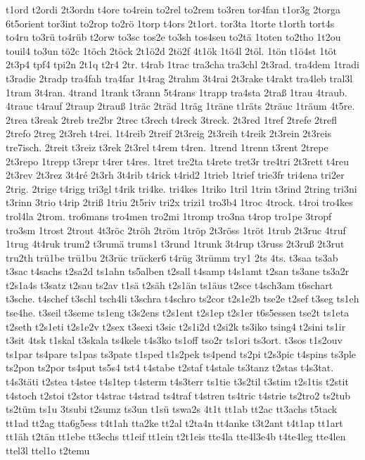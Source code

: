 {t1ord
t2ordi
2t3ordn
t4ore
to4rein
to2rel
to2rem
to3ren
tor4fan
t1or3g
2torga
6t5orient
tor3int
to2rop
to2rö
1torp
t4ors
2t1ort.
tor3ta
1torte
t1orth
tort4s
to4ru
to3rü
to4rüb
t2orw
to3sc
tos2e
to3sh
tos4seu
to2tä
1toten
to2tho
1t2ou
touil4
to3un
tö2c
1töch
2töck
2t1ö2d
2tö2f
4t1ök
1tö4l
2töl.
1tön
t1ö4st
1töt
2t3p4
tpf4
tpi2n
2t1q
t2r4
2tr.
t4rab
1trac
tra3cha
tra3chl
2t3rad.
tra4dem
1tradi
t3radie
2tradp
tra4fah
tra4far
1t4rag
2trahm
3t4rai
2t3rake
t4rakt
tra4leb
tral3l
1tram
3t4ran.
4trand
1trank
t3rann
5t4rans
1trapp
tra4sta
2traß
1trau
4traub.
4trauc
t4rauf
2traup
2trauß
1träc
2träd
1träg
1träne
t1räts
2träuc
1träum
4t5re.
2trea
t3reak
2treb
tre2br
2trec
t3rech
t4reck
3treck.
2t3red
1tref
2trefe
2trefl
2trefo
2treg
2t3reh
t4rei.
1t4reib
2treif
2t3reig
2t3reih
t4reik
2t3rein
2t3reis
tre7isch.
2treit
t3reiz
t3rek
2t3rel
t4rem
t4ren.
1trend
1trenn
t3rent
2trepe
2t3repo
1trepp
t3repr
t4rer
t4res.
1tret
tre2ta
t4rete
tret3r
tre4tri
2t3rett
t4reu
2t3rev
2t3rez
3t4ré
2t3rh
3t4rib
t4rick
t4rid2
1trieb
1trief
trie3fr
tri4ena
tri2er
2trig.
2trige
t4rigg
tri3gl
t4rik
tri4ke.
tri4kes
1triko
1tril
1trin
t3rind
2tring
tri3ni
t3rinn
3trio
t4rip
2triß
1triu
2t5riv
tri2x
trizi1
tro3b4
1troc
4trock.
t4roi
tro4kes
trol4la
2trom.
tro6mans
tro4men
tro2mi
1tromp
tro3na
t4rop
tro1pe
3tropf
tro3sm
1trost
2trout
4t3röc
2tröh
2tröm
1tröp
2t3röss
1tröt
1trub
2t3ruc
4truf
1trug
4t4ruk
trum2
t3rumä
trums1
t3rund
1trunk
3t4rup
t3russ
2t3ruß
2t3rut
tru2th
trü1be
trü1bu
2t3rüc
trücker6
t4rüg
3trümm
try1
2ts
4ts.
t3saa
ts3ab
t3sac
t4sachs
t2sa2d
ts1ahn
ts5alben
t2sall
t4samp
t4s1amt
t2san
ts3ane
ts3a2r
t2s1a4s
t3satz
t2sau
ts2av
t1sä
t2säh
t2s1än
ts1äus
t2sce
t4sch3am
t6schart
t3sche.
t4schef
t3schl
tsch4li
t3schra
t4schro
ts2cor
t2s1e2b
tse2e
t2sef
t3seg
ts1eh
tse4he.
t3seil
t3seme
ts1eng
t3s2ens
t2s1ent
t2s1ep
t2s1er
t6s5essen
tse2t
ts1eta
t2seth
t2s1eti
t2s1e2v
t2sex
t3sexi
t3sic
t2s1i2d
t2si2k
ts3iko
tsing4
t2sini
ts1ir
t3sit
4tsk
t1skal
t3skala
ts4kele
t4s3ko
ts1off
tso2r
ts1ori
ts3ort.
t3sos
t1s2ouv
ts1par
ts4pare
ts1pas
ts3pate
t1sped
t1s2pek
ts4pend
ts2pi
t2s3pic
t4spins
ts3ple
ts2pon
ts2por
ts4put
ts5s4
tst4
t4stabe
t2staf
t4stale
ts3tanz
t2stas
t4s3tat.
t4s3täti
t2stea
t4stee
t4s1tep
t4sterm
t4s3terr
ts1tie
t3s2til
t3stim
t2s1tis
t2stit
t4stoch
t2stoi
t2stor
t4strac
t4strad
ts4traf
t4stren
ts4tric
t4strie
ts2tro2
ts2tub
ts2tüm
ts1u
3tsubi
t2sumz
ts3un
t1sü
tswa2s
4t1t
tt1ab
tt2ac
tt3achs
t5tack
tt1ad
tt2ag
tta6g5ess
t4t1ah
tta2ke
tt2al
t2ta4n
tt4anke
t3t2ant
t4t1ap
tt1art
tt1äh
t2tän
tt1ebe
tt3echs
tt1eif
tt1ein
t2t1eis
tte4la
tte4l3e4b
t4te4leg
tte4len
ttel3l
ttel1o
t2temu
}
